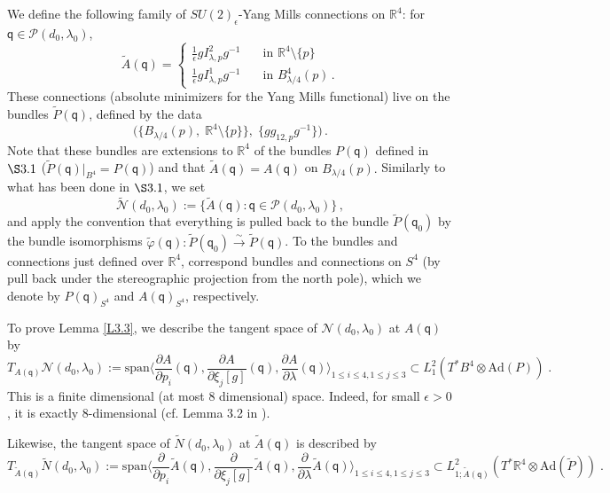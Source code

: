 \documentclass[11pt]{article}
\numberwithin{equation}{section} \setlength{\topmargin}{-35pt}
\newcommand{\PP}{\mathcal{P}}
\newcommand{\R}{\mathbb{R}}
\newcommand{\Ad}{\text{Ad}}
\newcommand{\q}{\mathsf{q}}
\begin{document}
\noindent We define the following family of $SU(2)_{\epsilon}$-Yang
Mills connections on $\R^4$: for $\q\in\PP(d_0,\lambda_0)$,
\begin{equation}
\label{tildeA(q)} \tilde{A}(\q)=\left\{\begin{array}{ll}
 \frac{1}{\epsilon}gI^2_{\lambda,p}g^{-1}&\quad\mbox{in } \R^4\setminus\{p\}\\
 \frac{1}{\epsilon}gI^1_{\lambda,p}g^{-1}&\quad\mbox{in }
 B^4_{\lambda/4}(p)\,.
 \end{array}\right.
 \end{equation}
 These connections (absolute minimizers for the Yang Mills functional)
 live on the bundles $\tilde{P}(\q)$, defined by the
 data
 \begin{equation}
 \label{Ptilde(q)}
 \biggl(\{B_{\lambda/4}(p), \;\R^4\setminus\{p\}\}, \;\{gg_{12,p}g^{-1}\}\biggr)\,.
 \end{equation}
 Note that these bundles are
 extensions to $\R^4$ of the bundles $P(\q)$ defined in $\S3.1$ ($\tilde{P}(\q)|_{B^4}=P(\q)$) and that $\tilde{A}(\q)=A(\q)$ on $B_{\lambda/4}(p).$
Similarly to what has been done in $\S3.1$,  we set \begin{equation}
\label{tildeN} \mathcal{\tilde
 N}(d_0,\lambda_0):=\{\tilde{A}(\q):\q\in\PP(d_0,\lambda_0)\}\,,
 \end{equation}
 and apply the
convention that everything is pulled back to the
 bundle $\tilde P(\q_0)$ by the bundle isomorphisms
 $\tilde{\varphi}(\q): \tilde P(\q_0)\overset{\sim}{\to}\tilde
 P(\q)$. To the bundles and connections just defined over $\R^4$, correspond bundles and
 connections on $S^4$ (by pull back under the stereographic
 projection from the north pole), which we denote by $P(\q)_{S^4}$ and
 $A(\q)_{S^4}$, respectively.

 \medskip

To prove Lemma \ref{L3.3}, we describe the tangent space of
$\mathcal N(d_0,\lambda_0)$ at $A(\q)$ by
\begin{equation}
\label{TN}
T_{A(\q)}\mathcal{N}(d_0,\lambda_0):=\text{span}\Big\langle\frac{\partial
A}{\partial p_i}(\q),\frac{\partial A}{\partial\xi_j[g]}(\q),
\frac{\partial A}{\partial\lambda}(\q)\Big\rangle_{1\le i\le 4,1\le
j\le 3}\subset L^2_1(T^{\ast}B^4\otimes\Ad(P))\;.
\end{equation}
This is a finite dimensional (at most 8 dimensional) space. Indeed,
for small $\epsilon>0$, it is exactly $8$-dimensional (cf. Lemma 3.2
in \cite{IM3}).

Likewise, the tangent space of $\tilde{N}(d_0,\lambda_0)$ at
$\tilde{A}(\q)$ is described by
\begin{equation}
\label{TtildeN}
T_{\tilde{A}(\q)}\tilde{N}(d_0,\lambda_0):=\text{span}\Big\langle\frac{\partial}{\partial
p_i}\tilde{A}(\q),\frac{\partial}
{\partial\xi_j[g]}\tilde{A}(\q),\frac{\partial}{\partial\lambda}\tilde{A}(\q)\Big\rangle_{1\le
i\le 4,1\le j\le 3} \subset
L^2_{1;\tilde{A}(\q)}(T^{\ast}\R^4\otimes\Ad(\tilde{P}))\;.
\end{equation}
\end{document}
